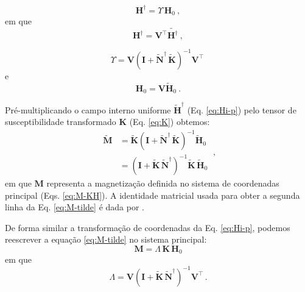 \begin{equation}
{\mathbf{H}^{\dagger}} =  
{\Upsilon} \, 
{\mathbf{H}_{0}} \: ,
\label{eq:Hi-p}
\end{equation}
em que
\begin{equation}
{\mathbf{H}^{\dagger}} =  \mathbf{V}^{\top} \tilde{\mathbf{H}^{\dagger}} \: ,
\label{eq:Hi-p-separado}
\end{equation}

\begin{equation}
{\Upsilon} =  {\mathbf{V} \left ( \mathbf{I} + \tilde{\mathbf{N}}^{\dagger} \, \tilde{\mathbf{K}} \right)^{-1} \mathbf{V}^{\top}} \:
\label{eq:upsilon-separado}
\end{equation}
e
\begin{equation}
{\mathbf{H}_{0}} =  {\mathbf{V} \tilde{\mathbf{H}}_{0}} \: .
\label{eq:h0-separado}
\end{equation}

Pré-multiplicando o campo interno uniforme $\tilde{\mathbf{H}}^{\dagger}$
(Eq. \ref{eq:Hi-p}) pelo tensor de susceptibilidade transformado ${\mathbf{K}}$ (Eq. \ref{eq:K}) obtemos:
\begin{equation}
\begin{split}
\tilde{\mathbf{M}} 
&= \tilde{\mathbf{K}} 
\left( \mathbf{I} + \tilde{\mathbf{N}}^{\dagger} \, \tilde{\mathbf{K}} \right)^{-1}
\tilde{\mathbf{H}}_{0} \\
&=  
\left( \mathbf{I} + \tilde{\mathbf{K}} \, \tilde{\mathbf{N}}^{\dagger} \right)^{-1}
\tilde{\mathbf{K}} \, \tilde{\mathbf{H}}_{0}
\end{split} \: ,
\label{eq:M-tilde}
\end{equation}
em que $\mathbf{M}$ representa a magnetização definida no sistema de coordenadas principal (Eqs. \ref{eq:M-KH}). A identidade matricial usada para obter a segunda linha da Eq. \ref{eq:M-tilde} é dada por \citet[p. ~151]{searle1982}.

De forma similar a transformação de coordenadas da Eq. \ref{eq:Hi-p}, podemos reescrever a equação \ref{eq:M-tilde} no sistema principal:
\begin{equation}
{\mathbf{M}} =
{\Lambda} \,
{\mathbf{K}} \,
{\mathbf{H}_{0}}
\label{eq:M-p}
\end{equation}
em que
\begin{equation}
{\Lambda} = {\mathbf{V} \left (\mathbf{I} + \tilde{\mathbf{K}} \, \tilde{\mathbf{N}}^{\dagger} \right)^{-1} \mathbf{V}^{\top}} \, .
\label{eq:Lambda}
\end{equation}

